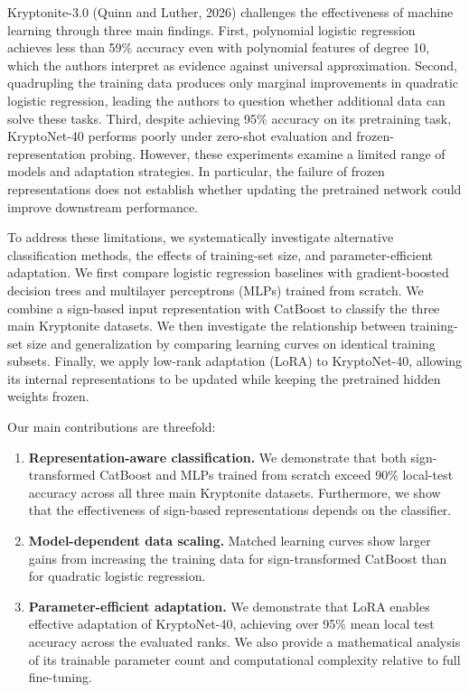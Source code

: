 \documentclass{article}
\begin{document}
Kryptonite-3.0 (Quinn and Luther, 2026) challenges the effectiveness of machine learning through three main findings. First, polynomial logistic regression achieves less than 59\% accuracy even with polynomial features of degree 10, which the authors interpret as evidence against universal approximation. Second, quadrupling the training data produces only marginal improvements in quadratic logistic regression, leading the authors to question whether additional data can solve these tasks. Third, despite achieving 95\% accuracy on its pretraining task, KryptoNet-40 performs poorly under zero-shot evaluation and frozen-representation probing. However, these experiments examine a limited range of models and adaptation strategies. In particular, the failure of frozen representations does not establish whether updating the pretrained network could improve downstream performance.

To address these limitations, we systematically investigate alternative classification methods, the effects of training-set size, and parameter-efficient adaptation. We first compare logistic regression baselines with gradient-boosted decision trees and multilayer perceptrons (MLPs) trained from scratch. We combine a sign-based input representation with CatBoost to classify the three main Kryptonite datasets. We then investigate the relationship between training-set size and generalization by comparing learning curves on identical training subsets. Finally, we apply low-rank adaptation (LoRA) to KryptoNet-40, allowing its internal representations to be updated while keeping the pretrained hidden weights frozen.

Our main contributions are threefold:

\begin{enumerate}
\item \textbf{Representation-aware classification.} We demonstrate that both sign-transformed CatBoost and MLPs trained from scratch exceed 90\% local-test accuracy across all three main Kryptonite datasets. Furthermore, we show that the effectiveness of sign-based representations depends on the classifier.
\item \textbf{Model-dependent data scaling.} Matched learning curves show larger gains from increasing the training data for sign-transformed CatBoost than for quadratic logistic regression.
\item \textbf{Parameter-efficient adaptation.} We demonstrate that LoRA enables effective adaptation of KryptoNet-40, achieving over 95\% mean local test accuracy across the evaluated ranks. We also provide a mathematical analysis of its trainable parameter count and computational complexity relative to full fine-tuning.
\end{enumerate}
\end{document}
